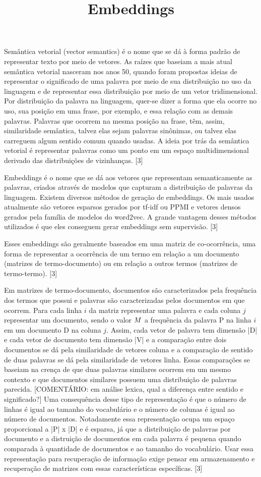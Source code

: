 \usepackage[utf8]{inputenc}
\usepackage[T1]{fontenc}

\title{Embeddings}

Semântica vetorial (vector semantics) é o nome que se dá à forma padrão de representar texto por meio de vetores.
As raízes que baseiam a mais atual semântica vetorial nasceram nos anos 50, quando foram propostas ideias de representar
o significado de uma palavra por meio de sua distribuição no uso da linguagem e de representar essa distribuição por
meio de um vetor tridimensional.
Por distribuição da palavra na linguagem, quer-se dizer a forma que ela ocorre no uso, sua posição
em uma frase, por exemplo, e essa relação com as demais palavras.
Palavras que ocorrem na mesma posição na frase, têm, assim,
similaridade semântica, talvez elas sejam palavras sinônimas, ou talvez elas carreguem algum sentido comum quando
usadas.
A ideia por trás da semântica vetorial é representar palavras como um ponto em um espaço multidimensional
derivado das distribuições de vizinhanças.
[3]

Embeddings é o nome que se dá aos vetores que representam semanticamente as palavras, criados através de modelos que
capturam a distribuição de palavras da linguagem.
Existem diversos métodos de geração de embeddings.
Os mais usados atualmente são vetores esparsos gerados por tf-idf ou PPMI e vetores densos gerados pela
família de modelos do word2vec.
A grande vantagem desses métodos utilizados é que eles conseguem gerar embeddings sem supervisão.
[3]

Esses embeddings são geralmente baseados em uma matriz de co-ocorrência, uma forma de representar a ocorrência de um
termo em relação a um documento (matrizes de termo-documento) ou em relação a outros termos (matrizes de termo-termo).
[3]

Em matrizes de termo-documento, documentos são caracterizados pela frequência dos termos que possui e palavras são caracterizadas
pelos documentos em que ocorrem.
Para cada linha $i$ da matriz representar uma palavra e cada coluna $j$ representar
um documento, sendo o valor $M\index{i,j}$ a frequência da palavra P na linha $i$ em um documento D na coluna $j$.
Assim, cada vetor de palavra tem dimensão |D| e cada vetor de documento tem dimensão |V| e a comparação entre dois documentos
se dá pela similaridade de vetores coluna e a comparação de sentido de duas palavras se dá pela similaridade de vetores linha.
Essas comparações se baseiam na crença de que duas palavras similares ocorrem em um mesmo contexto e que documentos similares
possuem uma distribuição de palavras parecida.
[COMENTÁRIO: em análise lexica, qual a diferença entre sentido e significado?]
Uma consequência desse tipo de representação é que o número de linhas é igual ao tamanho do vocabulário e o número de colunas
é igual ao número de documentos.
Notadamente essa representação ocupa um espaço proporcional a |P| x |D| e é esparsa, já que a distribuição de palavras por documento e
a distruição de documentos em cada palavra é pequena quando comparada à quantidade de documentos e ao tamanho do vocabulário.
Usar essa representação para recuperação de informação exige pensar em armazenamento e recuperação de matrizes com essas
características específicas.
[3]


